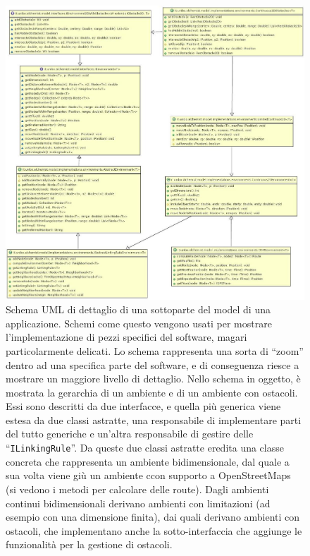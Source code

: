\documentclass[a4paper,12pt]{report}
\begin{document}
\begin{figure}
\centering{}
\includegraphics[width=\textwidth]{img/goodzoommodel}
\caption{Schema UML di dettaglio di una sottoparte del model di una applicazione.
%
Schemi come questo vengono usati per mostrare l'implementazione di pezzi specifici del software, magari particolarmente delicati.
%
Lo schema rappresenta una sorta di ``zoom'' dentro ad una specifica parte del software, e di conseguenza riesce a mostrare un maggiore livello di dettaglio.
%
Nello schema in oggetto, è mostrata la gerarchia di un ambiente e di un ambiente con ostacoli.
%
Essi sono descritti da due interfacce, e quella più generica viene estesa da due classi astratte, una responsabile di implementare parti del tutto generiche e un'altra responsabile di gestire delle ``\texttt{ILinkingRule}''.
%
Da queste due classi astratte eredita una classe concreta che rappresenta un ambiente bidimensionale, dal quale a sua volta viene giù un ambiente ccon supporto a OpenStreetMaps (si vedono i metodi per calcolare delle route).
%
Dagli ambienti continui bidimensionali derivano ambienti con limitazioni (ad esempio con una dimensione finita), dai quali derivano ambienti con ostacoli, che implementano anche la sotto-interfaccia che aggiunge le funzionalità per la gestione di ostacoli.
}
\label{img:goodzoommodel}
\end{figure}
\end{document}
